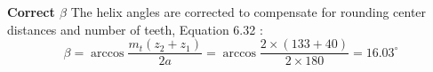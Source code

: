 \textbf{Correct $ \beta $} The helix angles are corrected to compensate for rounding center distances and number of teeth, Equation 6.32 \cite{tk1}:
\[\beta = \arccos\dfrac{m_t(z_2+z_1)}{2a} = \arccos\dfrac{2\times(133+40)}{2\times 180} = 16.03 ^\circ\]

%


